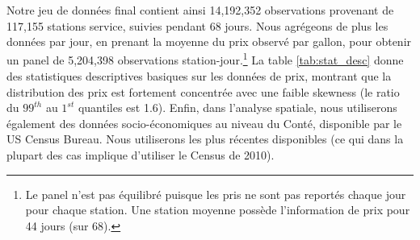{Notre jeu de données final contient ainsi 14,192,352 observations provenant de 117,155 stations service, suivies pendant 68 jours. Nous agrégeons de plus les données par jour, en prenant la moyenne du prix observé par gallon, pour obtenir un panel de 5,204,398 observations station-jour.\footnote{Le panel n'est pas équilibré puisque les pris ne sont pas reportés chaque jour pour chaque station. Une station moyenne possède l'information de prix pour 44 jours (sur 68).} La table \ref{tab:stat_desc} donne des statistiques descriptives basiques sur les données de prix, montrant que la distribution des prix est fortement concentrée avec une faible skewness (le ratio du $99^{th}$ au $1^{st}$ quantiles est 1.6). Enfin, dans l'analyse spatiale, nous utiliserons également des données socio-économiques au niveau du Conté, disponible par le US Census Bureau. Nous utiliserons les plus récentes disponibles (ce qui dans la plupart des cas implique d'utiliser le Census de 2010).
}





